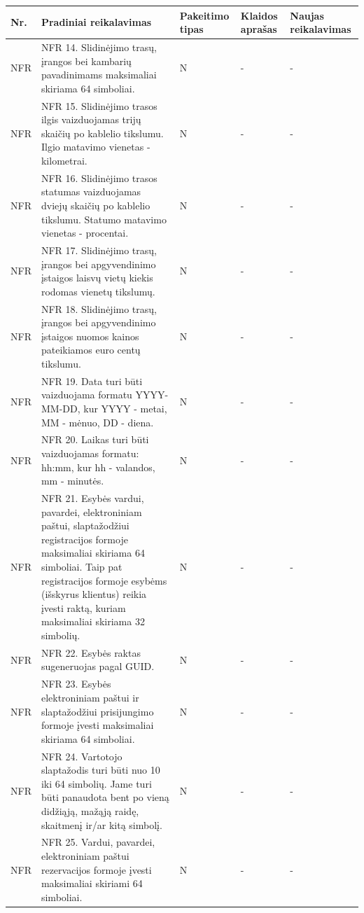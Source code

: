\documentclass[oneside]{VUMIFPSkursinis}
\begin{document}
\begin{longtable}{ | p{}|p{}|p{}|p{}|p{}| }  \hline

Nr. & Pradiniai reikalavimas&  Pakeitimo tipas & Klaidos aprašas  & Naujas reikalavimas \\ \hline

NFR & NFR 14. Slidinėjimo trasų, įrangos bei kambarių pavadinimams maksimaliai skiriama 64 simboliai. & N & - & - \\ \hline
NFR & NFR 15. Slidinėjimo trasos ilgis vaizduojamas trijų skaičių po kablelio tikslumu. Ilgio matavimo vienetas - kilometrai.  & N & - & - \\ \hline
NFR & NFR 16. Slidinėjimo trasos statumas vaizduojamas dviejų skaičių po kablelio tikslumu. Statumo matavimo vienetas - procentai. & N & - & - \\ \hline
NFR & NFR 17. Slidinėjimo trasų, įrangos bei apgyvendinimo įstaigos laisvų vietų kiekis rodomas vienetų tikslumų. & N & - & - \\ \hline
NFR & NFR 18. Slidinėjimo trasų, įrangos bei apgyvendinimo įstaigos nuomos kainos pateikiamos euro centų tikslumu. & N & - & - \\ \hline
NFR & NFR 19. Data turi būti vaizduojama formatu YYYY-MM-DD, kur YYYY - metai, MM - mėnuo, DD - diena. & N & - & - \\ \hline
NFR & NFR 20. Laikas turi būti vaizduojamas formatu: hh:mm, kur hh - valandos, mm - minutės. & N & - & - \\ \hline
NFR & NFR 21. Esybės vardui, pavardei, elektroniniam paštui, slaptažodžiui registracijos formoje maksimaliai skiriama 64 simboliai. Taip pat registracijos formoje 
esybėms (išskyrus klientus) reikia įvesti raktą, kuriam maksimaliai skiriama 32 simbolių. & N & - & - \\ \hline
NFR & NFR 22. Esybės raktas sugeneruojas pagal GUID. & N & - & - \\ \hline
NFR & NFR 23. Esybės elektroniniam paštui ir slaptažodžiui prisijungimo formoje įvesti maksimaliai skiriama 64 simboliai. & N & - & - \\ \hline
NFR & NFR 24. Vartotojo slaptažodis turi būti nuo 10 iki 64 simbolių. Jame turi būti panaudota bent po vieną didžiąją, mažąją raidę, skaitmenį ir/ar kitą simbolį. & N & - & - \\ \hline
NFR & NFR 25. Vardui, pavardei, elektroniniam paštui rezervacijos formoje įvesti maksimaliai skiriami 64 simboliai. & N & - & - \\ \hline

\end{longtable}
\end{document}
